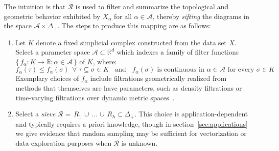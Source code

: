 \documentclass[10pt]{article}
\newenvironment{boxedenumerate}
  {\begin{mdframed}[font=\small, linewidth=1pt]}
  {\end{mdframed}}
\numberwithin{equation}{section}
\newcommand{\+}{%
	\raisebox{0.18ex}{\scaleobj{0.55}{+}}
}
\theoremstyle{definition}
\theoremstyle{definition}
\begin{document}
The intuition is that $\mathcal{R}$ is used to filter and summarize the topological and geometric behavior exhibited by $X_\alpha$ for all $\alpha \in \mathcal{A}$, thereby \emph{sifting} the diagrams in the space $\mathcal{A} \times \Delta_+$. 
The steps to produce this mapping are as follows:
\begin{boxedenumerate}
\begin{enumerate}
	\item Let $K$ denote a fixed simplicial complex constructed from the data set $X$. Select a parameter space $\mathcal{A} \subset \mathbb{R}^d$ which indexes a family of filter functions $\{\, f_\alpha : K \to \mathbb{R} :  \alpha \in \mathcal{A} \, \}$ of $K$, where:
	\begin{equation}
		f_\alpha(\tau) \leq f_\alpha(\sigma) \;\, \forall \; \tau \subseteq \sigma \in K  \;\; \text{ and } \; \; f_\alpha(\sigma) \text{ is continuous in } \alpha \in \mathcal{A} \text{ for every } \sigma \in K
	\end{equation}
	Exemplary choices of $f_\alpha$ include filtrations geometrically realized from methods that themselves are have parameters, such as density filtrations or time-varying filtrations over dynamic metric spaces~\cite{kim2021spatiotemporal}. %
	\item Select a \emph{sieve} $\mathcal{R} = \, R_1 \, \cup \, \dots \, \cup \, R_h \subset \Delta_+$. %
	This choice is application-dependent and typically requires a priori knowledge, though in section~\ref{sec:applications} we give evidence that random sampling may be sufficient for vectorization or data exploration purposes when $\mathcal{R}$ is unknown.
	

\end{enumerate}
\end{boxedenumerate}
\end{document}
